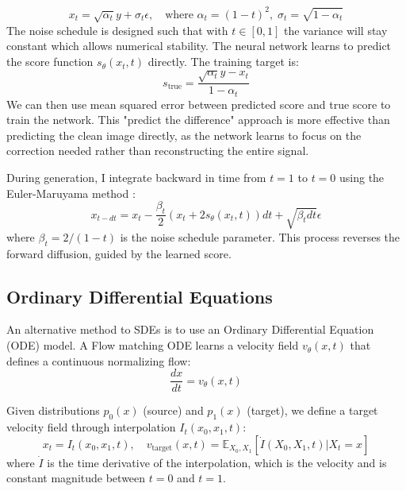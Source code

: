 \documentclass[conference,a4paper]{IEEEtran}
\begin{document}
\begin{equation}
    x_t = \sqrt{\alpha_t}y + \sigma_t\epsilon, \quad \text{where } \alpha_t = (1-t)^2, \; \sigma_t = \sqrt{1 - \alpha_t}
\end{equation}
The noise schedule is designed such that with $t \in [0, 1]$ the variance will stay constant which allows numerical stability. The neural network learns to predict the score function $s_\theta(x_t, t)$ directly. The training target is:
\begin{equation}
    s_{\text{true}} = \frac{\sqrt{\alpha_t}y - x_t}{1 - \alpha_t}
\end{equation}
We can then use mean squared error between predicted score and true score to train the network. This "predict the difference" approach is more effective than predicting the clean image directly, as the network learns to focus on the correction needed rather than reconstructing the entire signal.

During generation, I integrate backward in time from $t=1$ to $t=0$ using the Euler-Maruyama method \cite{burdenNumericalAnalysis2016}:
\begin{equation}
    x_{t-dt} = x_t - \frac{\beta_t}{2}(x_t + 2s_\theta(x_t, t))dt + \sqrt{\beta_t dt}\epsilon
\end{equation}
where $\beta_t = 2/(1-t)$ is the noise schedule parameter. This process reverses the forward diffusion, guided by the learned score.

\subsection{Ordinary Differential Equations}

An alternative method to SDEs is to use an Ordinary Differential Equation (ODE) model. A Flow matching ODE learns a velocity field $v_\theta(x, t)$ that defines a continuous normalizing flow:
\begin{equation}
    \frac{dx}{dt} = v_\theta(x, t)
\end{equation}

Given distributions $p_0(x)$ (source) and $p_1(x)$ (target), we define a target velocity field through interpolation $I_t(x_0, x_1, t)$:
\begin{equation}
    x_t = I_t(x_0, x_1, t), \quad v_{\text{target}}(x, t) = \mathbb{E}_{X_0, X_1}[\dot{I}(X_0, X_1, t) | X_t = x]
\end{equation}
where $\dot{I}$ is the time derivative of the interpolation, which is the velocity and is constant magnitude between $t=0$ and $t=1$. 
\end{document}
